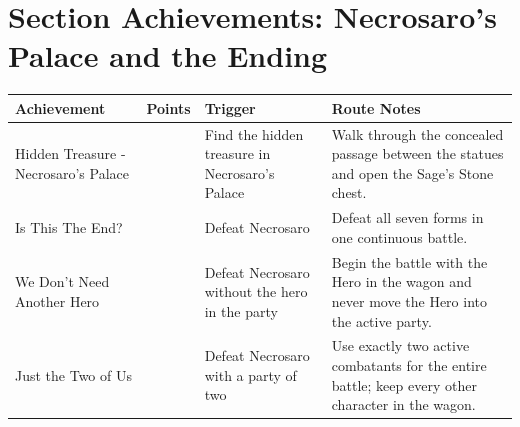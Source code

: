 \documentclass[
  american,
  10pt,
  letterpaper,
  oneside,
  open=any]{scrreprt}
\newcounter{none} %
\newenvironment{guidetable}{%
  \small\setstretch{1.0}%
  \setlength{\tabcolsep}{4pt}%
  \setlength{\LTpre}{8pt}\setlength{\LTpost}{10pt}%
  \renewcommand{\arraystretch}{1.16}%
}{ }
\begin{document}
\section{Section Achievements: Necrosaro's Palace and the
Ending}\label{section-achievements-necrosaros-palace-and-the-ending}

\begin{guidetable}

{\def\LTcaptype{none} %
\begin{longtable}[]{@{}
  >{\raggedright\arraybackslash}p{}
  >{\raggedleft\arraybackslash}p{}
  >{\raggedright\arraybackslash}p{}
  >{\raggedright\arraybackslash}p{}@{}}
\toprule\noalign{}
\begin{minipage}[b]{\linewidth}\raggedright
\color{GuideGreen}\bfseries Achievement
\end{minipage} & \begin{minipage}[b]{\linewidth}\raggedleft
\color{GuideGreen}\bfseries Points
\end{minipage} & \begin{minipage}[b]{\linewidth}\raggedright
\color{GuideGreen}\bfseries Trigger
\end{minipage} & \begin{minipage}[b]{\linewidth}\raggedright
\color{GuideGreen}\bfseries Route Notes
\end{minipage} \\
\midrule\noalign{}
\endhead
\bottomrule\noalign{}
\endlastfoot
Hidden Treasure - Necrosaro's Palace & 5 & Find the hidden treasure in
Necrosaro's Palace & Walk through the concealed passage between the
statues and open the Sage's Stone chest. \\
Is This The End? & 25 & Defeat Necrosaro & Defeat all seven forms in one
continuous battle. \\
We Don't Need Another Hero & 25 & Defeat Necrosaro without the hero in
the party & Begin the battle with the Hero in the wagon and never move
the Hero into the active party. \\
Just the Two of Us & 25 & Defeat Necrosaro with a party of two & Use
exactly two active combatants for the entire battle; keep every other
character in the wagon. \\
\end{longtable}
}

\end{guidetable}
\end{document}
